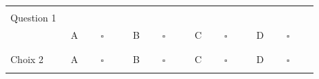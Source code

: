 \documentclass{book}%
\begin{document}
\begin{center}%
\begin{tabular}{| l l l l l |}%
\hline%
 & & & & \\%
Question 1\qquad \qquad\ & & & & \\%
 & A $\qquad \square \qquad$ & B $\qquad \square \qquad$ & C $\qquad \square \qquad$ & D $\qquad \square \qquad$ \\ %
 & & & &  \\%
\hline%
 & & & &  \\%
Choix 2 & A $\qquad \square \qquad$ & B $\qquad \square \qquad$ & C $\qquad \square \qquad$ & D $\qquad \square \qquad$ \\ %
 & & & &  \\%
\hline%
\end{tabular}%
\\ \vskip3mm%
\thispagestyle{empty}%
\end{center}%
\end{document}
